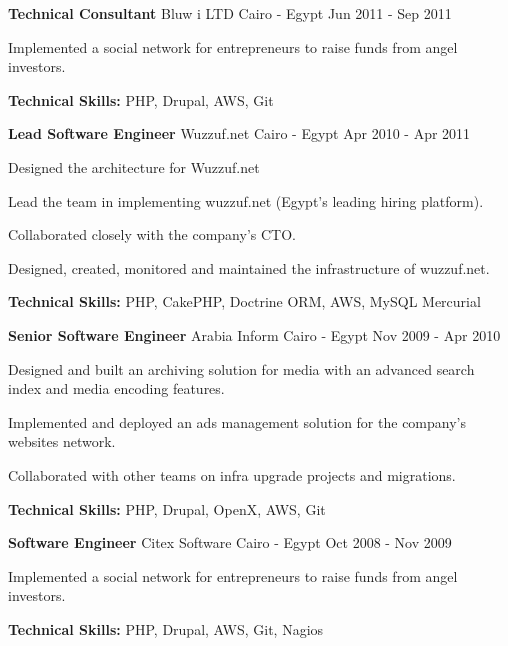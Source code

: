\begin{cventries}
	\cventry
	{\textbf{Technical Consultant}} %
	{Bluw i LTD} %
	{Cairo - Egypt} %
	{Jun 2011 - Sep 2011} %
	{
		\begin{cvitems} %
			\item {Implemented a social network for entrepreneurs to raise funds from angel investors.}
			\item {\textbf{Technical Skills:} PHP, Drupal, AWS, Git}
		\end{cvitems}
	}

	\cventry
	{\textbf{Lead Software Engineer}} %
	{Wuzzuf.net} %
	{Cairo - Egypt} %
	{Apr 2010 - Apr 2011} %
	{
		\begin{cvitems} %
			\item {Designed the architecture for Wuzzuf.net}
			\item {Lead the team in implementing wuzzuf.net (Egypt’s leading hiring platform).}
			\item {Collaborated closely with the company’s CTO.}
			\item {Designed, created, monitored and maintained the infrastructure of wuzzuf.net.}
			\item {\textbf{Technical Skills:} PHP, CakePHP, Doctrine ORM, AWS, MySQL Mercurial}
		\end{cvitems}
	}

	\cventry
	{\textbf{Senior Software Engineer}} %
	{Arabia Inform} %
	{Cairo - Egypt} %
	{Nov 2009 - Apr 2010} %
	{
		\begin{cvitems} %
			\item {Designed and built an archiving solution for media with an advanced search index and
			            media encoding features.}
			\item {Implemented and deployed an ads management solution for the company’s websites
			            network.}
			\item {Collaborated with other teams on infra upgrade projects and migrations.}
			\item {\textbf{Technical Skills:} PHP, Drupal, OpenX, AWS, Git}
		\end{cvitems}
	}

	\cventry
	{\textbf{Software Engineer}} %
	{Citex Software} %
	{Cairo - Egypt} %
	{Oct 2008 - Nov 2009} %
	{
		\begin{cvitems} %
			\item {Implemented a social network for entrepreneurs to raise funds from angel investors.}
			\item {\textbf{Technical Skills:} PHP, Drupal, AWS, Git, Nagios}
		\end{cvitems}
	}


\end{cventries}
